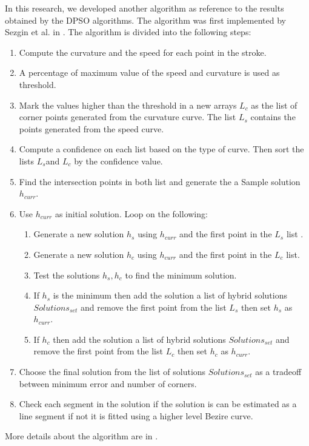 In this research, we developed another algorithm as reference to the results obtained by the DPSO algorithms. The algorithm was first implemented by  Sezgin et al. in \cite{earlyprocess}. The algorithm is divided into the following steps: 
\begin{enumerate}
	\item Compute the curvature and the speed for each point in the stroke. 
	\item   A percentage of maximum value of the speed and curvature is used as threshold.
		\item Mark the values higher than the threshold in a new arrays $L_c$ as the list of corner points generated from the curvature curve. The list $L_s$ contains the points generated from the speed curve.
	\item Compute a confidence on each list based on the type of curve. Then sort the lists $L_s$and $L_c$ by the confidence value. 
	\item Find the intersection points in both list and generate the a Sample solution $h_{curr}$. 
	\item Use $h_{curr}$ as initial solution. Loop on the following:
	
		\begin{enumerate}
			\item Generate a new solution $h_{s}$ using $h_{curr}$ and  the first point in the $L_s$ list .
			\item Generate a new solution $h_{c}$ using $h_{curr}$ and  the first point in the $L_c$ list.
			\item Test the solutions $h_{s},h_c$ to find the minimum solution.
			\item  If $h_s$ is the minimum then add the solution a list of hybrid solutions $Solutions_{set}$ and remove the first point from the list $L_s$ then set $h_s$ as $h_{curr}$. 
			\item If $h_c$ then add the solution a list of hybrid solutions $Solutions_{set}$ and remove the first point from the list $L_c$ then set $h_c$ as $h_{curr}$. 
		\end{enumerate}
		\item Choose the final solution from the list of solutions $Solutions_{set}$ as a tradeoff between  minimum error and number of corners.  
		\item Check each segment in the solution if the solution is can be estimated as a line segment if not it is fitted using a higher level Bezire curve. 
\end{enumerate}
More details about the algorithm are in \cite{earlyprocess}.


